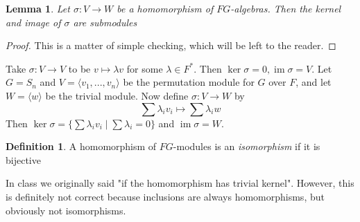 \documentclass[11pt, notitlepage]{article}
\numberwithin{equation}{section}
\theoremstyle{plain}
\newtheorem{lemma}[theorem]{Lemma}
\theoremstyle{definition}
\newtheorem{definition}[theorem]{Definition}
\newenvironment{remark}
	{\pushQED{\qed}\renewcommand{\qedsymbol}{$\blacklozenge$}\remarkx}
	{\popQED\endremarkx}
\newenvironment{example}
	{\pushQED{\qed}\renewcommand{\qedsymbol}{$\blacktriangleleft$}\examplex}
	{\popQED\endexamplex}
\DeclareMathOperator{\im}{im}
\begin{document}
\begin{lemma}
	Let $\sigma: V \rightarrow W$ be a homomorphism of $FG$-algebras. Then the kernel and image of $\sigma$ are submodules
\end{lemma}
\begin{proof}
	This is a matter of simple checking, which will be left to the reader.
\end{proof}

\begin{example}
	Take $\sigma: V \rightarrow V$ to be $v \mapsto \lambda v$ for some $\lambda \in F^*$. Then $\ker \sigma = 0, \im \sigma = V$. 
\end{example}
\begin{example}
	Let $G = S_n$ and $V = \langle v_1,..., v_n \rangle$ be the permutation module for $G$ over $F$, and let $W = \langle w \rangle$ be the trivial module. Now define $\sigma: V \rightarrow W$ by
\[
	\sum \lambda_i v_i \mapsto \sum \lambda_i w
\]
Then $\ker \sigma = \{\sum \lambda_i v_i \mid \sum \lambda_i = 0\}$ and $\im \sigma = W$. 
\end{example}

\begin{definition}
	A homomorphism of $FG$-modules is an \textit{isomorphism} if it is bijective
\end{definition}
\begin{remark}
	In class we originally said "if the homomorphism has trivial kernel". However, this is definitely not correct because inclusions are always homomorphisms, but obviously not isomorphisms. 
\end{remark}
\end{document}
